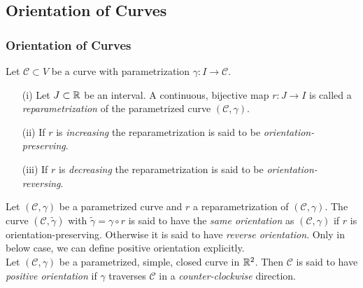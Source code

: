 \documentclass[12pt, t]{beamer}
\renewcommand{\emph}[1]{{\color{Turquoise3}\textsl{#1}}}
\newcommand{\nullspace}{~\\[15pt]}
\begin{document}
\subsection{Orientation of Curves}
\begin{frame}[allowframebreaks]
    \frametitle{Orientation of Curves}
    Let $\mathcal{C}\subset V$ be a curve with parametrization $\gamma:I\to\mathcal{C}$.
    \begin{itemize}
        \item[(i)] Let $J\subset\mathbb{R}$ be an interval. A continuous, bijective map $r:J\to I$ is called a \emph{reparametrization} of the parametrized curve $(\mathcal{C},\gamma)$.
        \item[(ii)] If $r$ is \emph{increasing} the reparametrization is said to be \emph{orientation-preserving}.
        \item[(iii)] If $r$ is \emph{decreasing} the reparametrization is said to be \emph{orientation-reversing}.
    \end{itemize}
    \vspace{1cm}
    Let $(\mathcal{C},\gamma)$ be a parametrized curve and $r$ a reparametrization of $(\mathcal{C},\gamma)$. The curve $(\mathcal{C},\widetilde{\gamma})$ with $\widetilde{\gamma}=\gamma\circ r$ is said to have the \emph{same orientation} as $(\mathcal{C},\gamma)$ if $r$ is orientation-preserving. Otherwise it is said to have \emph{reverse orientation}.
    \newpage
    Only in below case, we can define positive orientation explicitly.\nullspace
    Let $(\mathcal{C},\gamma)$ be a parametrized, simple, closed curve in $\mathbb{R}^2$. Then $\mathcal{C}$ is said to have \emph{positive orientation} if $\gamma$ traverses $\mathcal{C}$ in a \emph{counter-clockwise} direction.
\end{frame}
\end{document}

